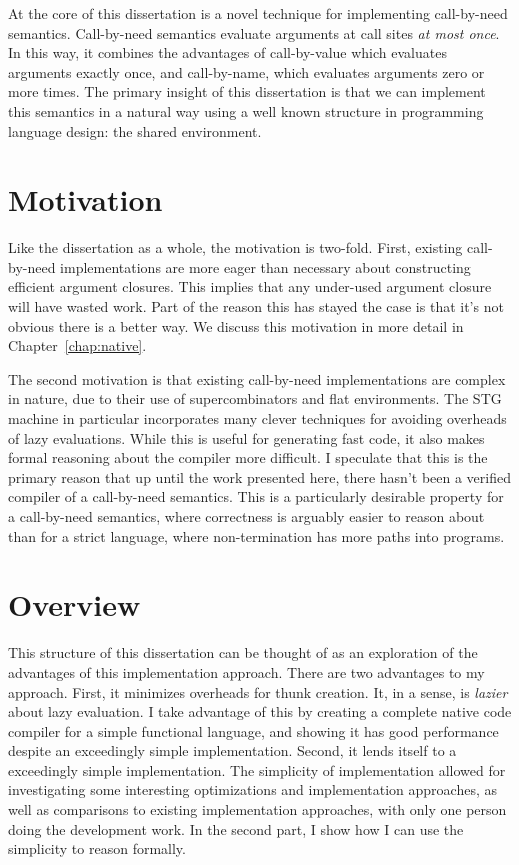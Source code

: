 At the core of this dissertation is a novel technique for implementing call-by-need
semantics. Call-by-need semantics evaluate arguments at call sites \emph{at most
once}. In this way, it combines the advantages of call-by-value which evaluates
arguments exactly once, and call-by-name, which evaluates arguments zero or more
times. The primary insight of this dissertation is that we can implement this
semantics in a natural way using a well known structure in programming language
design: the shared environment. 

\section{Motivation}

Like the dissertation as a whole, the motivation is two-fold. First, existing
call-by-need implementations are more eager than necessary about constructing
efficient argument closures. This implies that any under-used argument closure
will have wasted work. Part of the reason this has stayed the case is that it's
not obvious there is a better way. We discuss this motivation in more detail in
Chapter~\ref{chap:native}. 

The second motivation is that existing call-by-need implementations are complex
in nature, due to their use of supercombinators and flat environments. The STG
machine in particular incorporates many clever techniques for avoiding overheads
of lazy evaluations. While this is useful for generating fast code, it also
makes formal reasoning about the compiler more difficult. I speculate that this
is the primary reason that up until the work presented here, there hasn't been a
verified compiler of a call-by-need semantics. This is a particularly desirable
property for a call-by-need semantics, where correctness is arguably easier to
reason about than for a strict language, where non-termination has more paths
into programs. 

\section{Overview}

This structure of this dissertation can be thought of as an exploration of the
advantages of this implementation approach. There are two advantages to my
approach. First, it minimizes overheads for thunk creation. It, in a sense, is
\emph{lazier} about lazy evaluation. I take advantage of this by creating a
complete native code compiler for a simple functional language, and showing it
has good performance despite an exceedingly simple implementation. Second, it lends
itself to a exceedingly simple implementation. The simplicity of implementation
allowed for investigating some interesting optimizations and implementation
approaches, as well as comparisons to existing implementation approaches, with
only one person doing the development work. In the second part, I show how I can
use the simplicity to reason formally. 

